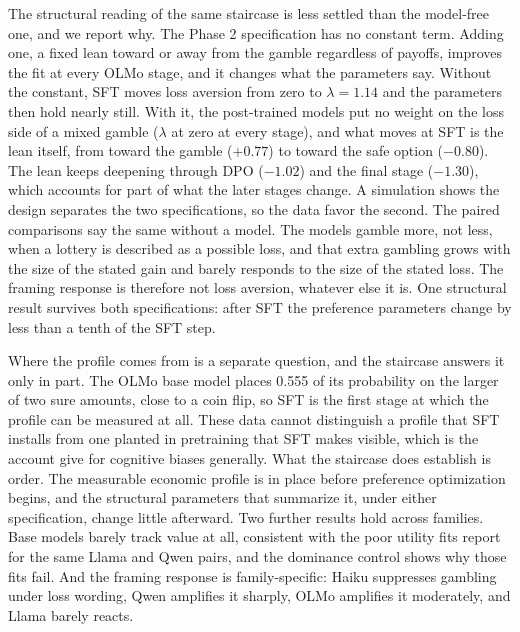 \documentclass[11pt]{article}
\begin{document}
The structural reading of the same staircase is less settled than the model-free one, and we report
why. The Phase 2 specification has no constant term. Adding one, a fixed lean toward or away from the
gamble regardless of payoffs, improves the fit at every OLMo stage, and it changes what the
parameters say. Without the constant, SFT moves loss aversion from zero to $\lambda = 1.14$ and the
parameters then hold nearly still. With it, the post-trained models put no weight on the loss side of a
mixed gamble ($\lambda$ at zero at every stage), and what moves at SFT is the lean itself, from toward
the gamble ($+0.77$) to toward the safe option ($-0.80$). The lean keeps deepening through DPO
($-1.02$) and the final stage ($-1.30$), which accounts for part of what the later stages change. A
simulation shows the design separates the two specifications, so the data favor the second.
The paired comparisons say the same without a model. The models gamble more, not less, when a lottery
is described as a possible loss, and that extra gambling grows with the size of the stated gain and
barely responds to the size of the stated loss. The framing response is therefore not loss aversion,
whatever else it is. One structural result survives both specifications: after SFT the preference
parameters change by less than a tenth of the SFT step.

Where the profile comes from is a separate question, and the staircase answers it only in part.
The OLMo base model places 0.555 of its probability on the larger of two sure amounts, close to a coin
flip, so SFT is the first stage at which the profile can be measured at all. These data cannot
distinguish a profile that SFT installs from one planted in pretraining that SFT makes visible, which
is the account \citet{itzhak2025} give for cognitive biases generally. What the
staircase does establish is order. The measurable economic profile is in place before preference
optimization begins, and the structural parameters that summarize it, under either specification,
change little afterward. Two further results hold
across families. Base models barely track value at all, consistent with the poor utility fits
\citet{wang2025} report for the same Llama and Qwen pairs, and the dominance control shows why
those fits fail. And the framing response is family-specific: Haiku suppresses gambling under loss
wording, Qwen amplifies it sharply, OLMo amplifies it moderately, and Llama barely reacts.
\end{document}
